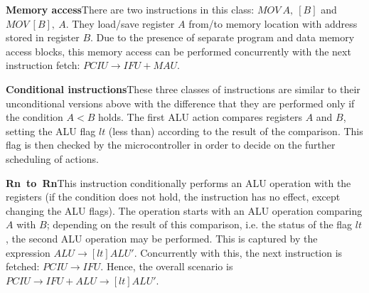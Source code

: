 \textbf{Memory access}\quad{}There are two instructions in this class:
$\mathit{MOV\ A,\ [B]}$ and $\mathit{MOV\ [B],\ A}$. They load/save
register $A$ from/to memory location with address stored in register
$B$. Due to the presence of separate program and data memory access
blocks, this memory access can be performed concurrently with the
next instruction fetch: $\mathit{PCIU}\rightarrow\mathit{IFU}+\mathit{MAU}$.

\textbf{Conditional instructions}\quad{}These three classes of instructions
are similar to their unconditional versions above with the difference
that they are performed only if the condition $A<B$ holds. The first
ALU action compares registers $A$ and $B$, setting the ALU flag
$lt$ (less than) according to the result of the comparison. This
flag is then checked by the microcontroller in order to decide on
the further scheduling of actions. 

\textbf{Rn~to~Rn}\quad{}This instruction conditionally performs
an ALU operation with the registers (if the condition does not hold,
the instruction has no effect, except changing the ALU flags). The
operation starts with an ALU operation comparing $A$ with $B$; depending
on the result of this comparison, i.e. the status of the flag $lt$,
the second ALU operation may be performed. This is captured by the
expression $\mathit{ALU}\rightarrow[lt]\mathit{ALU'}$. Concurrently
with this, the next instruction is fetched: $\mathit{PCIU}\rightarrow\mathit{IFU}$.
Hence, the overall scenario is $\mathit{PCIU}\rightarrow\mathit{IFU}+\mathit{ALU}\rightarrow[lt]\mathit{ALU'}$.

